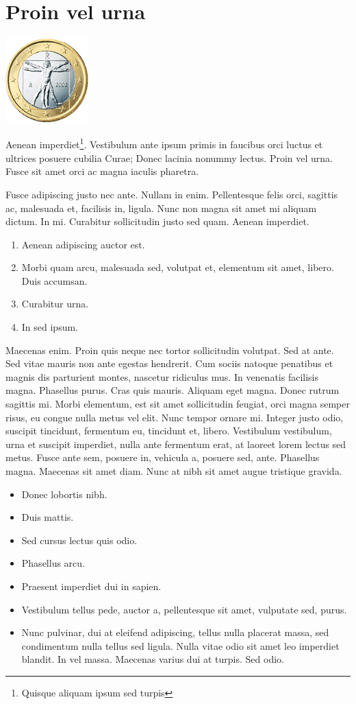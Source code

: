 \documentclass[cfonts]{nostarch}
\begin{document}
\lipsum[36-37]

\chapter{Proin vel urna}{\includegraphics[width=1.264in]{100euroit}}

Aenean imperdiet\footnote{Quisque aliquam ipsum sed turpis}.
Vestibulum ante ipsum pri\-m\-is in faucibus orci luctus et ultrices
posuere cubilia Curae; Donec lacinia nonummy lectus. Proin vel urna.
Fusce sit amet orci ac magna iaculis pharetra.

Fusce adipiscing justo nec ante. Nullam in enim.  Pellentesque felis
orci, sagittis ac, malesuada et, facilisis in, ligula. Nunc non magna
sit amet mi aliquam dictum. In mi. Curabitur sollicitudin justo sed
quam. Aenean imperdiet.
\begin{enumerate}
\item Aenean adipiscing auctor est.
\item Morbi quam arcu, malesuada sed, volutpat et, elementum sit
  amet, libero.  Duis accumsan.
\item Curabitur urna.
\item In sed ipsum.
\end{enumerate}

Maecenas enim. Proin quis neque nec tortor sollicitudin volutpat.  Sed
at ante. Sed vitae mauris non ante egestas hendrerit.  Cum sociis
natoque penatibus et magnis dis parturient montes, nascetur ridiculus
mus. In venenatis facilisis magna. Phasellus purus. Cras quis mauris.
Aliquam eget magna. Donec rutrum sagittis mi. Morbi elementum, est sit
amet sollicitudin feugiat, orci magna semper risus, eu congue nulla
metus vel elit. Nunc tempor ornare mi.  Integer justo odio, suscipit
tincidunt, fermentum eu, tincidunt et, libero. Vestibulum vestibulum,
urna et suscipit imperdiet, nulla ante fermentum erat, at laoreet
lorem lectus sed metus. Fusce ante sem, posuere in, vehicula a,
posuere sed, ante. Phasellus magna.  Maecenas sit amet diam. Nunc at
nibh sit amet augue tristique gravida.
\begin{itemize}
\item Donec lobortis nibh.
\item Duis mattis.
\item Sed cursus lectus quis odio.
\item Phasellus arcu.
\item Praesent imperdiet dui in sapien.
\item Vestibulum tellus pede, auctor a, pellentesque sit amet, vulputate sed,
  purus.
\item Nunc pulvinar, dui at eleifend adipiscing, tellus nulla
  placerat massa, sed condimentum nulla tellus sed ligula. Nulla
  vitae odio sit amet leo imperdiet blandit. In vel massa. Maecenas
  varius dui at turpis. Sed odio.
\end{itemize}
\end{document}
